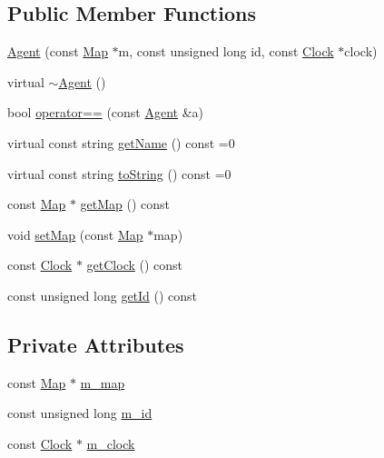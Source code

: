 \subsection*{Public Member Functions}
\begin{DoxyCompactItemize}
\item 
\mbox{\hyperlink{class_agent_a0ad923f2f9966b65a5d908cb9da4217c}{Agent}} (const \mbox{\hyperlink{class_map}{Map}} $\ast$m, const unsigned long id, const \mbox{\hyperlink{class_clock}{Clock}} $\ast$clock)
\item 
virtual \mbox{\hyperlink{class_agent_a4feb26df1cf81760a0e411e393c24d4e}{$\sim$\+Agent}} ()
\item 
bool \mbox{\hyperlink{class_agent_afa2b3a408bb0694aea46fb2bb59bacf7}{operator==}} (const \mbox{\hyperlink{class_agent}{Agent}} \&a)
\item 
virtual const string \mbox{\hyperlink{class_agent_afe6c72d91baf9ee4fe77ea1ed7fef3ba}{get\+Name}} () const =0
\item 
virtual const string \mbox{\hyperlink{class_agent_a44f291596d10c7878b0641d6ec156328}{to\+String}} () const =0
\item 
const \mbox{\hyperlink{class_map}{Map}} $\ast$ \mbox{\hyperlink{class_agent_ad1870edeea33b059eca75079be2eb002}{get\+Map}} () const
\item 
void \mbox{\hyperlink{class_agent_a87a661874cffb03fa9e474e872810260}{set\+Map}} (const \mbox{\hyperlink{class_map}{Map}} $\ast$map)
\item 
const \mbox{\hyperlink{class_clock}{Clock}} $\ast$ \mbox{\hyperlink{class_agent_af80a21a067d04788c23d719d07b04038}{get\+Clock}} () const
\item 
const unsigned long \mbox{\hyperlink{class_agent_a51d2d781636f524dc151f3da10955613}{get\+Id}} () const
\end{DoxyCompactItemize}
\subsection*{Private Attributes}
\begin{DoxyCompactItemize}
\item 
const \mbox{\hyperlink{class_map}{Map}} $\ast$ \mbox{\hyperlink{class_agent_ab24d62bbfc22946d0c72221c8a43f04a}{m\+\_\+map}}
\item 
const unsigned long \mbox{\hyperlink{class_agent_ad1f52e164c2a829ef4418940567d6e37}{m\+\_\+id}}
\item 
const \mbox{\hyperlink{class_clock}{Clock}} $\ast$ \mbox{\hyperlink{class_agent_a534f22ebb0573aa1d58d274632e592cf}{m\+\_\+clock}}
\end{DoxyCompactItemize}


